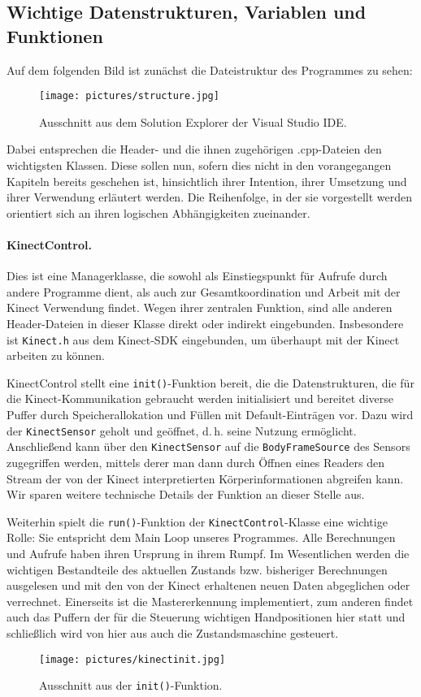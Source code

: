 	\subsection{Wichtige Datenstrukturen, Variablen und Funktionen}\label{sec:ds}
	Auf dem folgenden Bild ist zunächst die Dateistruktur des Programmes zu sehen:
	\begin{figure}[h]
	\centering
	\texttt{[image: pictures/structure.jpg]}
	\caption{Ausschnitt aus dem Solution Explorer der Visual Studio IDE.}
	\end{figure}
	Dabei entsprechen die Header- und die ihnen zugehörigen .cpp-Dateien den wichtigsten Klassen. Diese sollen nun, sofern dies nicht in den vorangegangen Kapiteln bereits geschehen ist, hinsichtlich ihrer Intention, ihrer Umsetzung und ihrer Verwendung erläutert werden. Die Reihenfolge, in der sie vorgestellt werden orientiert sich an ihren logischen Abhängigkeiten zueinander.\par\medskip
	\paragraph{KinectControl.} Dies ist eine Managerklasse, die sowohl als Einstiegspunkt für Aufrufe durch andere Programme dient, als auch zur Gesamtkoordination und Arbeit mit der Kinect Verwendung findet. Wegen ihrer zentralen Funktion, sind alle anderen Header-Dateien in dieser Klasse direkt oder indirekt eingebunden. Insbesondere ist \texttt{Kinect.h} aus dem Kinect-SDK eingebunden, um überhaupt mit der Kinect arbeiten zu können.\par 
	KinectControl stellt eine \texttt{init()}-Funktion bereit, die die Datenstrukturen, die für die Kinect-Kommunikation gebraucht werden initialisiert und bereitet diverse Puffer durch Speicherallokation und Füllen mit Default-Einträgen vor. Dazu wird der \texttt{KinectSensor} geholt und \glqq geöffnet\grqq{}, d.\,h. seine Nutzung ermöglicht. Anschließend kann über den \texttt{KinectSensor} auf die \texttt{BodyFrameSource} des Sensors zugegriffen werden, mittels derer man dann durch Öffnen eines Readers den Stream der von der Kinect interpretierten Körperinformationen abgreifen kann. Wir sparen weitere technische Details der Funktion an dieser Stelle aus.\par\smallskip
	Weiterhin spielt die \texttt{run()}-Funktion der \texttt{KinectControl}-Klasse eine wichtige Rolle: Sie entspricht dem \glqq Main Loop\grqq{} unseres Programmes. Alle Berechnungen und Aufrufe haben ihren Ursprung in ihrem Rumpf. Im Wesentlichen werden die wichtigen Bestandteile des aktuellen Zustands bzw. bisheriger Berechnungen ausgelesen und mit den von der Kinect erhaltenen neuen Daten abgeglichen oder verrechnet. Einerseits ist die Mastererkennung implementiert, zum anderen findet auch das Puffern der für die Steuerung wichtigen Handpositionen hier statt und schließlich wird von hier aus auch die Zustandsmaschine gesteuert.\par
	\begin{figure}[h]
	\centering
	\texttt{[image: pictures/kinectinit.jpg]}
	\caption{Ausschnitt aus der \texttt{init()}-Funktion.}
	\end{figure}
	\par\medskip
